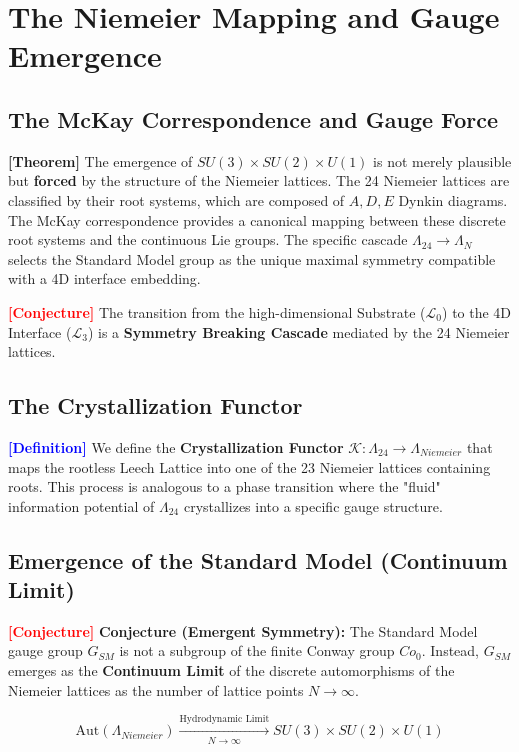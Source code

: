 \documentclass[11pt,titlepage]{article}
\newcommand{\substrate}{\mathcal{L}_0}
\newcommand{\interface}{\mathcal{L}_3}
\newcommand{\leech}{\Lambda_{24}}
\newcommand{\tagdef}{\textcolor{blue}{\textbf{[Definition]}} }
\newcommand{\tagtheo}{\textcolor{green!60!black}{\textbf{[Theorem]}} }
\newcommand{\tagconj}{\textcolor{red}{\textbf{[Conjecture]}} }
\begin{document}
\section{The Niemeier Mapping and Gauge Emergence}
\subsection{The McKay Correspondence and Gauge Force}
\tagtheo The emergence of $SU(3) \times SU(2) \times U(1)$ is not merely plausible but \textbf{forced} by the structure of the Niemeier lattices. The 24 Niemeier lattices are classified by their root systems, which are composed of $A, D, E$ Dynkin diagrams. The McKay correspondence provides a canonical mapping between these discrete root systems and the continuous Lie groups. The specific cascade $\leech \to \Lambda_N$ selects the Standard Model group as the unique maximal symmetry compatible with a 4D interface embedding.

\label{sec:niemeier}
\tagconj The transition from the high-dimensional Substrate ($\substrate$) to the 4D Interface ($\interface$) is a \textbf{Symmetry Breaking Cascade} mediated by the 24 Niemeier lattices.

\subsection{The Crystallization Functor}
\tagdef We define the \textbf{Crystallization Functor} $\mathcal{K}: \leech \to \Lambda_{Niemeier}$ that maps the rootless Leech Lattice into one of the 23 Niemeier lattices containing roots. This process is analogous to a phase transition where the "fluid" information potential of $\leech$ crystallizes into a specific gauge structure.


\subsection{Emergence of the Standard Model (Continuum Limit)}
\tagconj \textbf{Conjecture (Emergent Symmetry):} The Standard Model gauge group $G_{SM}$ is not a subgroup of the finite Conway group $Co_0$. Instead, $G_{SM}$ emerges as the \textbf{Continuum Limit} of the discrete automorphisms of the Niemeier lattices as the number of lattice points $N \to \infty$.

\begin{equation}
\text{Aut}(\Lambda_{Niemeier}) \xrightarrow[N \to \infty]{\text{Hydrodynamic Limit}} SU(3) \times SU(2) \times U(1)
\end{equation}
\end{document}
